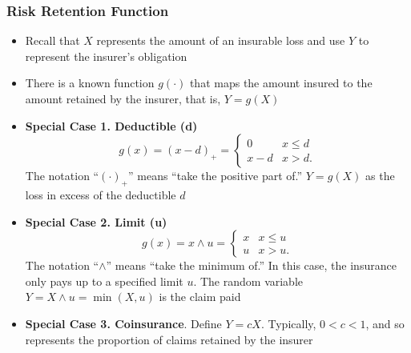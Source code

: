 \documentclass{beamer}
\begin{document}
\begin{frame}%
\frametitle{Risk Retention Function}
\begin{itemize}
\item Recall that $X$ represents the amount of an insurable loss and use $Y$ to represent the insurer's
obligation %
\item There is a known function $g(\cdot)$ that maps the amount insured to the amount retained by the insurer, that is, $Y=g(X)$ %
\item \textbf{Special Case 1. Deductible (d)} %
\begin{equation*}
g(x) = (x-d)_+ =
\begin{cases}
0 & x \le d\\
x - d & x > d .
\end{cases}
\end{equation*}
The notation ``$(\cdot)_+$'' means ``take the positive part of.''
$Y=g(X)$ as the loss in excess of the deductible $d$ \vspace{2mm}
\item \textbf{Special Case 2. Limit (u)} %
\begin{equation*}
g(x) = x \wedge u =
\begin{cases}
x & x \le u\\
u & x > u .
\end{cases}
\end{equation*}
The notation ``$\wedge$'' means ``take the minimum of.'' In this case, the insurance only pays up to a specified limit $u$. The random variable $Y= X \wedge u = \min(X,u)$ is the claim paid %
\item \textbf{Special Case 3. Coinsurance}. Define $Y = c X$. Typically, $0<c<1$, and so represents the proportion of claims retained by the insurer
\end{itemize}
\end{frame}
\end{document}
